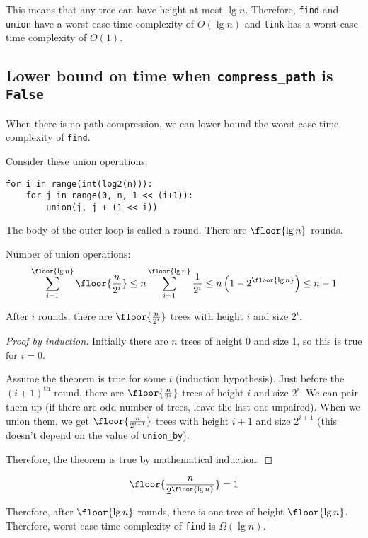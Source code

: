 This means that any tree can have height at most $\lg n$.
Therefore, \texttt{find} and \texttt{union} have a worst-case time complexity of $O(\lg n)$
and \texttt{link} has a worst-case time complexity of $O(1)$.

\subsection{Lower bound on time when \texttt{compress\_path} is \texttt{False}}

When there is no path compression, we can lower bound the worst-case time complexity of \texttt{find}.

Consider these union operations:
\begin{lstlisting}
for i in range(int(log2(n))):
    for j in range(0, n, 1 << (i+1)):
        union(j, j + (1 << i))
\end{lstlisting}
The body of the outer loop is called a round.
There are $\floor{\lg n}$ rounds.

Number of union operations:
\[ \sum_{i=1}^{\floor{\lg n}} \floor{\frac{n}{2^i}}
\le n \sum_{i=1}^{\floor{\lg n}} \frac{1}{2^i}
\le n \left( 1 - 2^{\floor{\lg n}} \right)
\le n - 1 \]

\begin{theorem} After $i$ rounds, there are $\floor{\frac{n}{2^i}}$ trees with height $i$ and size $2^i$. \end{theorem}
\begin{proof}[Proof by induction]

Initially there are $n$ trees of height 0 and size 1, so this is true for $i=0$.

Assume the theorem is true for some $i$ (induction hypothesis).
Just before the $(i+1)^{\textrm{th}}$ round, there are $\floor{\frac{n}{2^i}}$ trees
of height $i$ and size $2^i$.
We can pair them up (if there are odd number of trees, leave the last one unpaired).
When we union them, we get $\floor{\frac{n}{2^{i+1}}}$ trees with height $i+1$ and size $2^{i+1}$
(this doesn't depend on the value of \texttt{union\_by}).

Therefore, the theorem is true by mathematical induction.
\end{proof}

\begin{theorem} \[ \floor{\frac{n}{2^{\floor{\lg n}}}} = 1 \] \end{theorem}

Therefore, after $\floor{\lg n}$ rounds, there is one tree of height $\floor{\lg n}$.
Therefore, worst-case time complexity of \texttt{find} is $\Omega(\lg n)$.

